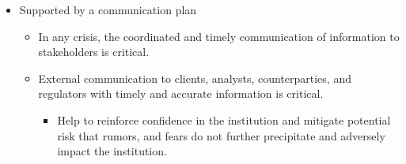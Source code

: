 \begin{itemize}
    \begin{itemize}
    \item Involvement of appropriate stakeholder groups:
        \begin{itemize}
        \item Asset liability committee (ALCO)
        \item Risk and capital committee
        \item Investment committee
        \item Business units:
            \begin{itemize}
            \item Finance, corporate treasury, risk, operations , technology
            \end{itemize}
        \end{itemize}
    \item Ensure internal and external stakeholders to remain confident in the institution's financial strength.
    \end{itemize}
\item Supported by a communication plan
    \begin{itemize}
    \item In any crisis, the coordinated and timely communication of information to stakeholders is critical.
    \item External communication to clients, analysts, counterparties, and regulators with timely and accurate information is critical.
        \begin{itemize}
        \item Help to reinforce confidence in the institution and mitigate potential risk that rumors, and fears do not further precipitate and adversely impact the institution.
        \end{itemize}
    \end{itemize}
\end{itemize}


